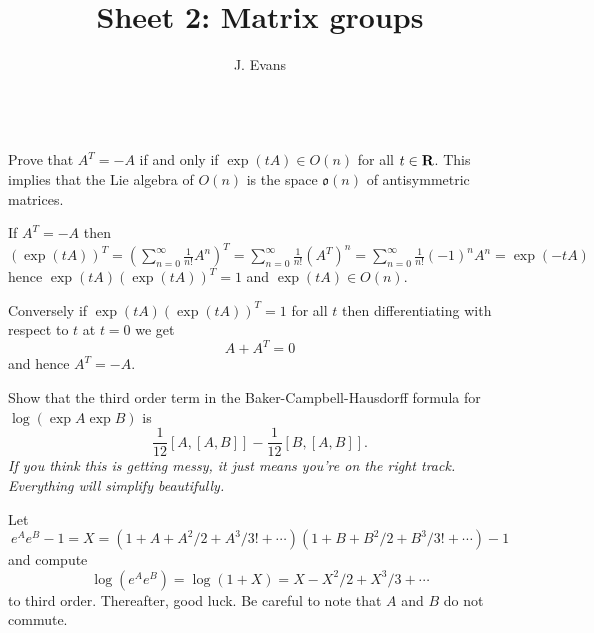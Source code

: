 \documentclass[12pt]{article}
\title{Sheet 2: Matrix groups}
\author{J. Evans}
\date{}
\begin{document}
\maketitle


\begin{question}\ \\
Prove that $A^T=-A$ if and only if $\exp(tA)\in O(n)$ for all $t\in\mathbf{R}$. This implies that the Lie algebra of $O(n)$ is the space $\mathfrak{o}(n)$ of antisymmetric matrices.
\end{question}

\begin{answer}
If $A^T=-A$ then $(\exp(tA))^T=\left(\sum_{n=0}^{\infty}\frac{1}{n!}A^n\right)^T=\sum_{n=0}^{\infty}\frac{1}{n!}(A^T)^n=\sum_{n=0}^{\infty}\frac{1}{n!}(-1)^nA^n=\exp(-tA)$ hence $\exp(tA)\left(\exp(tA)\right)^T=1$ and $\exp(tA)\in O(n)$.

Conversely if $\exp(tA)\left(\exp(tA)\right)^T=1$ for all $t$ then differentiating with respect to $t$ at $t=0$ we get
\[A+A^T=0\]
and hence $A^T=-A$.
\end{answer}
\newpage

\bigskip

\begin{question}
Show that the third order term in the Baker-Campbell-Hausdorff formula for $\log(\exp A\exp B)$ is
\[\frac{1}{12}[A,[A,B]]-\frac{1}{12}[B,[A,B]].\]
{\em If you think this is getting messy, it just means you're on the right track. Everything will simplify beautifully.}
\end{question}

\begin{answer}
Let
\[e^Ae^B-1=X=\left(1+A+A^2/2+A^3/3!+\cdots\right)\left(1+B+B^2/2+B^3/3!+\cdots\right)-1\]
and compute
\[\log(e^Ae^B)=\log(1+X)=X-X^2/2+X^3/3+\cdots\]
to third order. Thereafter, good luck. Be careful to note that $A$ and $B$ do not commute.
\end{answer}
\newpage

\bigskip
\end{document}
